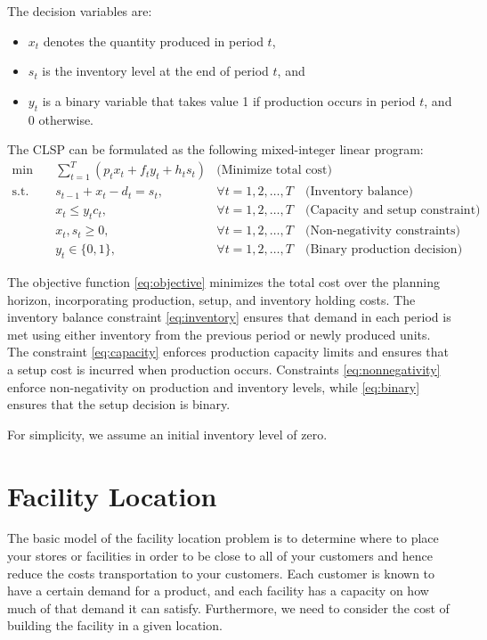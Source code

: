The decision variables are:
\begin{itemize}
    \item \( x_t \) denotes the quantity produced in period \( t \),
    \item \( s_t \) is the inventory level at the end of period \( t \), and
    \item \( y_t \) is a binary variable that takes value 1 if production occurs in period \( t \), and 0 otherwise.
\end{itemize}

The CLSP can be formulated as the following mixed-integer linear program:
\begin{align}
    \min \quad & \sum_{t=1}^{T} \left( p_t x_t + f_t y_t + h_t s_t \right)  & \text{(Minimize total cost)} \label{eq:objective} \\
    \text{s.t.} \quad & s_{t-1} + x_t - d_t = s_t, & \forall t = 1,2,\dots,T  \quad \text{(Inventory balance)} \label{eq:inventory} \\
    & x_t \leq y_t c_t,  & \forall t = 1,2,\dots,T  \quad \text{(Capacity and setup constraint)} \label{eq:capacity} \\
    & x_t, s_t \geq 0,  & \forall t = 1,2,\dots,T  \quad \text{(Non-negativity constraints)} \label{eq:nonnegativity} \\
    & y_t \in \{0,1\},  & \forall t = 1,2,\dots,T  \quad \text{(Binary production decision)} \label{eq:binary}
\end{align}

The objective function \eqref{eq:objective} minimizes the total cost over the planning horizon, incorporating production, setup, and inventory holding costs. The inventory balance constraint \eqref{eq:inventory} ensures that demand in each period is met using either inventory from the previous period or newly produced units. The constraint \eqref{eq:capacity} enforces production capacity limits and ensures that a setup cost is incurred when production occurs. Constraints \eqref{eq:nonnegativity} enforce non-negativity on production and inventory levels, while \eqref{eq:binary} ensures that the setup decision is binary.

For simplicity, we assume an initial inventory level of zero.

\section{Facility Location}
\todoSection{}
The basic model of the facility location problem is to determine where to place your stores or facilities in order to be close to all of your customers and hence reduce the costs transportation to your customers.  Each customer is known to have a certain demand for a product, and each facility has a capacity on how much of that demand it can satisfy.  Furthermore, we need to consider the cost of building the facility in a given location.

